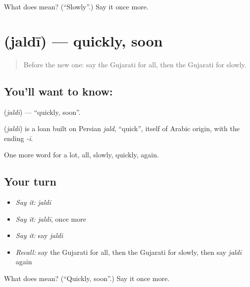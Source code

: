 \begin{tcolorbox}[breakable,colback=teal!4,colframe=teal!35!black,title={Before you move on}]
What does  mean? (\textquotedblleft{}Slowly\textquotedblright{}.) Say it once more.
\end{tcolorbox}
\section[\texorpdfstring{\gu{જલદી} (jaldī)}{જલદી (jaldī)}]{ (jaldī) — quickly, soon}

\label{lesson:GU-C76-quickly}



\begin{quote}
Before the new one: say the Gujarati for all, then the Gujarati for slowly.
\end{quote}

\subsection*{You'll want to know: }
\textbf{} (\emph{jaldī}) — \textquotedblleft{}quickly, soon\textquotedblright{}.

\begin{cousinweb}
\textbf{} (\emph{jaldī}) is a loan built on Persian \emph{jald}, \textquotedblleft{}quick\textquotedblright{}, itself of Arabic origin, with the ending \emph{-ī}.
\end{cousinweb}

\begin{grammarlens}[title={What you've built}]
One more word for a lot, all, slowly, quickly, again.
\end{grammarlens}

\subsection*{Your turn}
\begin{itemize}
\raggedright
  \item \emph{Say it:} \emph{jaldī}
  \item \emph{Say it:} \emph{jaldī}, once more
  \item \emph{Say it:} say \emph{jaldī}
  \item \emph{Recall:} say the Gujarati for all, then the Gujarati for slowly, then say \emph{jaldī} again
\end{itemize}

\begin{tcolorbox}[breakable,colback=teal!4,colframe=teal!35!black,title={Before you move on}]
What does  mean? (\textquotedblleft{}Quickly, soon\textquotedblright{}.) Say it once more.
\end{tcolorbox}
